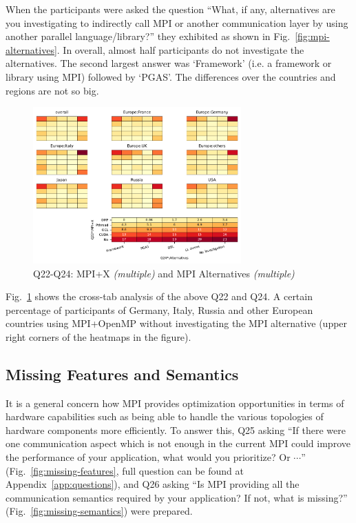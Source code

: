 \documentclass[conference,10pt,letterpaper]{IEEEtran}
\def\myquote#1{`#1'}
\begin{document}
When the participants were asked the question ``What, if any,
alternatives are you investigating to indirectly call MPI or another
communication layer by using another parallel language/library?'' they
exhibited as shown in Fig.~\ref{fig:mpi-alternatives}. In overall,
almost half participants do not investigate the alternatives. The second
largest answer was \myquote{Framework} (i.e. a framework or library
using MPI) followed by \myquote{PGAS}. The
differences over the countries and regions are not so big. 
  
\begin{figure}[htb]
\begin{center}
\includegraphics[width=8cm]{Figs/Q22-Q24.pdf}
\caption{Q22-Q24: MPI+X {\it(multiple)} and MPI Alternatives {\it(multiple)}}
\label{fig:mpi-x-and-alternatives}
\end{center}
\end{figure}

Fig.~\ref{fig:mpi-x-and-alternatives} shows the cross-tab analysis of
the above Q22 and Q24. A certain percentage of participants of
Germany, Italy, Russia and other European countries using MPI+OpenMP
without investigating the MPI alternative (upper right corners of the
heatmaps in the figure). 

\subsection{Missing Features and Semantics}

It is a general concern how MPI provides optimization
opportunities in terms of hardware capabilities such as being able to
handle the various topologies of hardware components more 
efficiently. To answer this, Q25 asking ``If there were one
communication aspect which is not enough in the current MPI could
improve the performance of your application, what would you
prioritize? Or $\cdots$'' (Fig.~\ref{fig:missing-features}, full
question can be found at Appendix~\ref{app:questions}), and Q26 asking
``Is MPI providing all the communication semantics required by your
application? If not, what is missing?''
(Fig.~\ref{fig:missing-semantics}) were prepared. 
\end{document}
